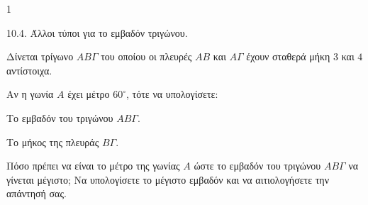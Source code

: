 \begin{ylh}{1}
    \item 10.4. Άλλοι τύποι για το εμβαδόν τριγώνου.
\end{ylh}
\begin{figure}
    \centering
\end{figure}
Δίνεται τρίγωνο $AB\Gamma$ του οποίου οι πλευρές $AB$ και $A\Gamma$ έχουν σταθερά μήκη $3$ και $4$ αντίστοιχα.
\begin{alist}
\item Αν η γωνία $A$ έχει μέτρο $60^\circ$, τότε να υπολογίσετε:
    \begin{rlist}
        \item Το εμβαδόν του τριγώνου $AB\Gamma$. 
        \item Το μήκος της πλευράς $B\Gamma$. 
    \end{rlist}
\item Πόσο πρέπει να είναι το μέτρο της γωνίας $A$ ώστε το εμβαδόν του τριγώνου $AB\Gamma$ να γίνεται μέγιστο; Να υπολογίσετε το μέγιστο εμβαδόν και να αιτιολογήσετε την απάντησή σας. 
\end{alist}